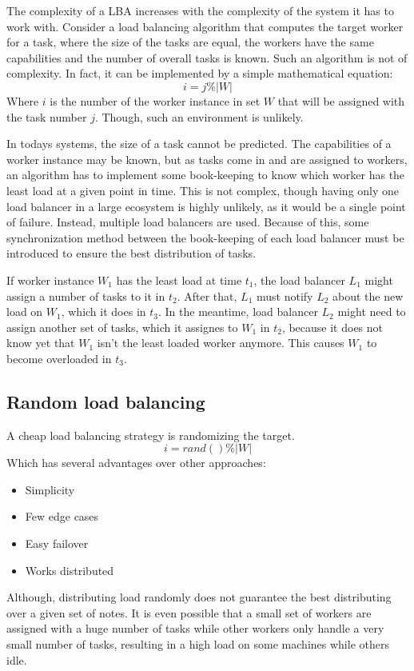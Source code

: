 The complexity of a \ac{LBA} increases with the complexity of the system it has
to work with.
Consider a load balancing algorithm that computes the target worker for a task,
where the size of the tasks are equal, the workers have the same capabilities
and the number of overall tasks is known.
Such an algorithm is not of complexity.
In fact, it can be implemented by a simple mathematical equation:
\begin{equation}
    i = j \% |W|
\end{equation}
Where $i$ is the number of the worker instance in set $W$ that will be assigned
with the task number $j$.
Though, such an environment is unlikely.

In todays systems, the size of a task cannot be predicted.
The capabilities of a worker instance may be known, but as tasks come in and are
assigned to workers, an algorithm has to implement some book-keeping to know
which worker has the least load at a given point in time.
This is not complex, though having only one load balancer in a large ecosystem
is highly unlikely, as it would be a single point of failure.
Instead, multiple load balancers are used.
Because of this, some synchronization method between the book-keeping of each
load balancer must be introduced to ensure the best distribution of tasks.

If worker instance $W_1$ has the least load at time $t_1$, the load balancer
$L_1$ might assign a number of tasks to it in $t_2$.
After that, $L_1$ must notify $L_2$ about the new load on $W_1$, which it does
in $t_3$.
In the meantime, load balancer $L_2$ might need to assign another set of tasks,
which it assignes to $W_1$ in $t_2$, because it does not know yet that $W_1$
isn't the least loaded worker anymore.
This causes $W_1$ to become overloaded in $t_3$.

\subsection{Random load balancing}

A cheap load balancing strategy is randomizing the target.
\begin{equation}
    i = rand() \% |W|
\end{equation}
Which has several advantages over other approaches:
\begin{itemize}
    \item Simplicity
    \item Few edge cases
    \item Easy failover
    \item Works distributed
\end{itemize} %
Although, distributing load randomly does not guarantee the best distributing
over a given set of notes.
It is even possible that a small set of workers are assigned
with a huge number of tasks while other workers only handle a very small number
of tasks, resulting in a high load on some machines while others idle.

